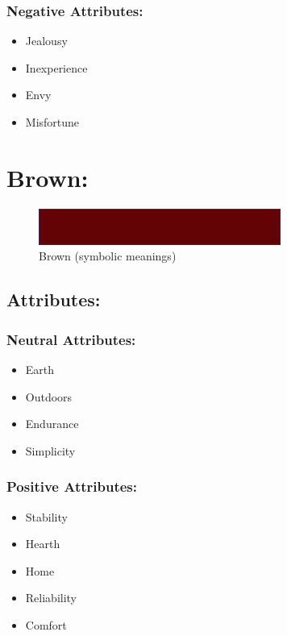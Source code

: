 \documentclass[openleft,oneside,showtrims]{memoir}
\begin{document}
\subsubsection*{Negative Attributes:}
\label{sec:orgc596f70}

\begin{itemize}
\item Jealousy
\item Inexperience
\item Envy
\item Misfortune
\end{itemize}

\section{Brown:}
\label{sec:org4b3fe11}

\begin{figure}[htbp]
\centering
\includegraphics[width=300px]{./media/brown-banner.png}
\caption{\label{fig:HAP-WR-012}Brown (symbolic meanings)}
\end{figure}

\subsection{Attributes:}
\label{sec:org40dbfaa}

\subsubsection*{Neutral Attributes:}
\label{sec:orgd5c8f22}

\begin{itemize}
\item Earth
\item Outdoors
\item Endurance
\item Simplicity
\end{itemize}

\subsubsection*{Positive Attributes:}
\label{sec:orgda77f24}

\begin{itemize}
\item Stability
\item Hearth
\item Home
\item Reliability
\item Comfort
\end{itemize}
\end{document}

